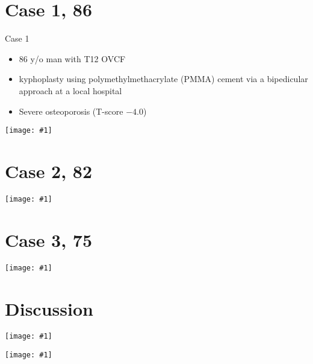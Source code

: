\documentclass{beamer}
\newcommand*{\solo}[1]{\centering\texttt{[image: \#1]}}
\begin{document}
\section{Case 1, 86 \male}
\begin{frame}{Case 1}
    \begin{itemize}
        \item 86 y/o man with T12 OVCF
        \item kyphoplasty using polymethylmethacrylate (PMMA) cement via a
              bipedicular approach at a local hospital
        \item Severe osteoporosis (T-score $-4.0$)
    \end{itemize}
\end{frame}

\begin{frame}{}
    \solo{F1.jpg}
\end{frame}

\section{Case 2, 82 \male}
\begin{frame}{}
    \solo{F2.jpg}
\end{frame}

\section{Case 3, 75 \female}
\begin{frame}{}
    \solo{F3.jpg}
\end{frame}

\section{Discussion}
\begin{frame}{}
    \solo{F4.jpg}
\end{frame}

\begin{frame}{}
    \solo{T1.pdf}
\end{frame}
\end{document}
